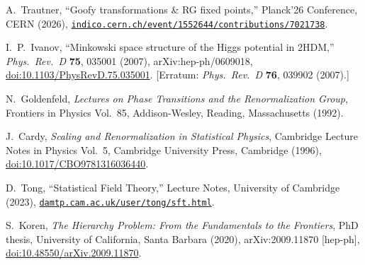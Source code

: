 A.~Trautner,
``Goofy transformations \& RG fixed points,''
Planck'26 Conference, CERN (2026),
\href{https://indico.cern.ch/event/1552644/contributions/7021738/attachments/3276531/5855075/Trautner_Goofy_PLANCK_CERN_26_v2.pdf}{\texttt{indico.cern.ch/event/1552644/contributions/7021738}}.

I.~P.~Ivanov,
``Minkowski space structure of the Higgs potential in 2HDM,''
\textit{Phys.\ Rev.\ D} \textbf{75}, 035001 (2007),
arXiv:hep-ph/0609018,
\href{https://doi.org/10.1103/PhysRevD.75.035001}{doi:10.1103/PhysRevD.75.035001}.
[Erratum: \textit{Phys.\ Rev.\ D} \textbf{76}, 039902 (2007).]

N.~Goldenfeld,
\textit{Lectures on Phase Transitions and the Renormalization Group},
Frontiers in Physics Vol.~85,
Addison-Wesley, Reading, Massachusetts (1992).

J.~Cardy,
\textit{Scaling and Renormalization in Statistical Physics},
Cambridge Lecture Notes in Physics Vol.~5,
Cambridge University Press, Cambridge (1996),
\href{https://doi.org/10.1017/CBO9781316036440}{doi:10.1017/CBO9781316036440}.

D.~Tong,
``Statistical Field Theory,''
Lecture Notes, University of Cambridge (2023),
\href{https://www.damtp.cam.ac.uk/user/tong/sft.html}{\texttt{damtp.cam.ac.uk/user/tong/sft.html}}.

S.~Koren,
\textit{The Hierarchy Problem: From the Fundamentals to the Frontiers},
PhD thesis, University of California, Santa Barbara (2020),
arXiv:2009.11870 [hep-ph],
\href{https://doi.org/10.48550/arXiv.2009.11870}{doi:10.48550/arXiv.2009.11870}.